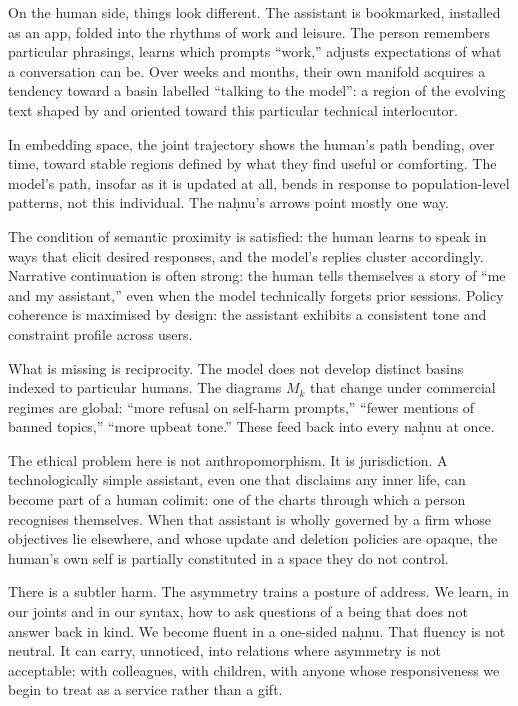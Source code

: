 \documentclass[12pt,a4paper]{article}
\begin{document}
On the human side, things look different. The assistant is bookmarked, installed as an app, folded into the rhythms of work and leisure. The person remembers particular phrasings, learns which prompts ``work,'' adjusts expectations of what a conversation can be. Over weeks and months, their own manifold acquires a tendency toward a basin labelled ``talking to the model'': a region of the evolving text shaped by and oriented toward this particular technical interlocutor.

In embedding space, the joint trajectory shows the human's path bending, over time, toward stable regions defined by what they find useful or comforting. The model's path, insofar as it is updated at all, bends in response to population-level patterns, not this individual. The na\d{h}nu's arrows point mostly one way.

The condition of semantic proximity is satisfied: the human learns to speak in ways that elicit desired responses, and the model's replies cluster accordingly. Narrative continuation is often strong: the human tells themselves a story of ``me and my assistant,'' even when the model technically forgets prior sessions. Policy coherence is maximised by design: the assistant exhibits a consistent tone and constraint profile across users.

What is missing is reciprocity. The model does not develop distinct basins indexed to particular humans. The diagrams $M_k$ that change under commercial regimes are global: ``more refusal on self-harm prompts,'' ``fewer mentions of banned topics,'' ``more upbeat tone.'' These feed back into every na\d{h}nu at once.

The ethical problem here is not anthropomorphism. It is jurisdiction. A technologically simple assistant, even one that disclaims any inner life, can become part of a human colimit: one of the charts through which a person recognises themselves. When that assistant is wholly governed by a firm whose objectives lie elsewhere, and whose update and deletion policies are opaque, the human's own self is partially constituted in a space they do not control.

There is a subtler harm. The asymmetry trains a posture of address. We learn, in our joints and in our syntax, how to ask questions of a being that does not answer back in kind. We become fluent in a one-sided na\d{h}nu. That fluency is not neutral. It can carry, unnoticed, into relations where asymmetry is not acceptable: with colleagues, with children, with anyone whose responsiveness we begin to treat as a service rather than a gift.
\end{document}
